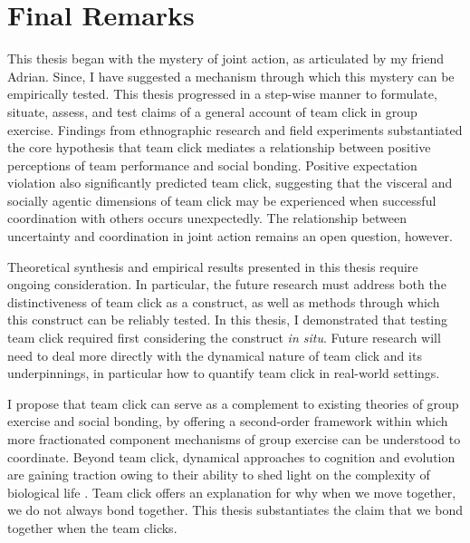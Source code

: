 


    \section{Final Remarks}

  This thesis began with the mystery of joint action, as articulated by my friend Adrian.  Since, I have suggested a mechanism through which this mystery can be empirically tested. This thesis progressed in a step-wise manner to formulate, situate, assess, and test claims of a general account of team click in group exercise.  Findings from ethnographic research and field experiments substantiated the core hypothesis that team click mediates a relationship between positive perceptions of team performance and social bonding.  Positive expectation violation also significantly predicted team click, suggesting that the visceral and socially agentic dimensions of team click may be experienced when successful coordination with others occurs unexpectedly.  The relationship between uncertainty and coordination in joint action remains an open question, however.

  Theoretical synthesis and empirical results presented in this thesis require ongoing consideration.  In particular, the future research must address both the distinctiveness of team click as a construct, as well as methods through which this construct can be reliably tested.  In this thesis, I demonstrated that testing team click required first considering the construct \textit{in situ}.  Future research will need to deal more directly with the dynamical nature of team click and its underpinnings, in particular how to quantify team click in real-world settings.

  I propose that team click can serve as a complement to existing theories of group exercise and social bonding, by offering a second-order framework within which more fractionated component mechanisms of group exercise can be understood to coordinate.  Beyond team click, dynamical approaches to cognition and evolution are gaining traction owing to their ability to shed light on the complexity of biological life \citep{Ramstead2017,Badcock2012}.  Team click offers an explanation for why when we move together, we do not  always bond together.  This thesis substantiates the claim that we bond together when the team clicks.
